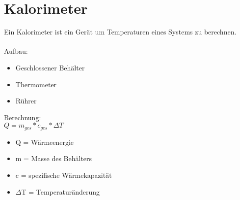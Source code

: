 \section{Kalorimeter} \label{sec:kalorimeter}
Ein Kalorimeter ist ein Gerät um Temperaturen eines Systems zu berechnen. \\ \\
Aufbau: 
\begin{itemize}
    \item Geschlossener Behälter
    \item Thermometer
    \item Rührer \\
\end{itemize}

Berechnung: \\
$Q = m_{ges} * c_{ges} * \Delta T$ \\

\begin{itemize}
    \item Q = Wärmeenergie
    \item m = Masse des Behälters
    \item c = spezifische Wärmekapazität
    \item $\Delta$T = Temperaturänderung
\end{itemize}
